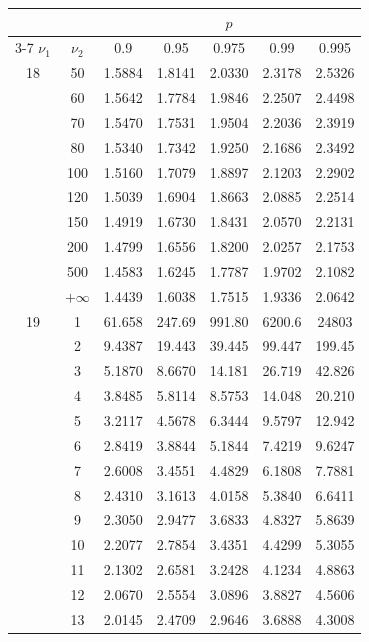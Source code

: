 \newpage
\noindent
\begin{minipage}{0.49\textwidth}
	\begin{center}
		\begin{tabular}{ccccccc}
			& & \multicolumn{5}{c}{$p$}\\
			\cline{3-7}
			$\nu_1$ & $\nu_2$ & 0.9 & 0.95 & 0.975 & 0.99 & 0.995 \\
			\midrule
			18 & 50 & 1.5884 & 1.8141 & 2.0330 & 2.3178 & 2.5326 \\
			& 60 & 1.5642 & 1.7784 & 1.9846 & 2.2507 & 2.4498 \\
			& 70 & 1.5470 & 1.7531 & 1.9504 & 2.2036 & 2.3919 \\
			& 80 & 1.5340 & 1.7342 & 1.9250 & 2.1686 & 2.3492 \\
			& 100 & 1.5160 & 1.7079 & 1.8897 & 2.1203 & 2.2902 \\
			& 120 & 1.5039 & 1.6904 & 1.8663 & 2.0885 & 2.2514 \\
			& 150 & 1.4919 & 1.6730 & 1.8431 & 2.0570 & 2.2131 \\
			& 200 & 1.4799 & 1.6556 & 1.8200 & 2.0257 & 2.1753 \\
			& 500 & 1.4583 & 1.6245 & 1.7787 & 1.9702 & 2.1082 \\
			& $+\infty$ & 1.4439 & 1.6038 & 1.7515 & 1.9336 & 2.0642 \\
			\midrule
			19 & 1 & 61.658 & 247.69 & 991.80 & 6200.6 & 24803 \\
			& 2 & 9.4387 & 19.443 & 39.445 & 99.447 & 199.45 \\
			& 3 & 5.1870 & 8.6670 & 14.181 & 26.719 & 42.826 \\
			& 4 & 3.8485 & 5.8114 & 8.5753 & 14.048 & 20.210 \\
			& 5 & 3.2117 & 4.5678 & 6.3444 & 9.5797 & 12.942 \\
			& 6 & 2.8419 & 3.8844 & 5.1844 & 7.4219 & 9.6247 \\
			& 7 & 2.6008 & 3.4551 & 4.4829 & 6.1808 & 7.7881 \\
			& 8 & 2.4310 & 3.1613 & 4.0158 & 5.3840 & 6.6411 \\
			& 9 & 2.3050 & 2.9477 & 3.6833 & 4.8327 & 5.8639 \\[5pt]
			& 10 & 2.2077 & 2.7854 & 3.4351 & 4.4299 & 5.3055 \\
			& 11 & 2.1302 & 2.6581 & 3.2428 & 4.1234 & 4.8863 \\
			& 12 & 2.0670 & 2.5554 & 3.0896 & 3.8827 & 4.5606 \\
			& 13 & 2.0145 & 2.4709 & 2.9646 & 3.6888 & 4.3008 \\

\end{tabular}
\end{center}
\end{minipage}
